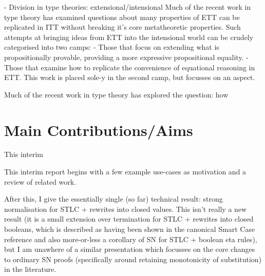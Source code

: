 \documentclass[
    a4paper, %
    fontsize=9.5pt, %
    twoside=false, %
	numbers=noenddot, %
	fontmethod=tex, %
]{kaobook}
\begin{document}


- Division in type theories: extensional/intensional
Much of the recent work in type theory has examined questions about many
properties of ETT can be replicated in ITT without breaking it's core
metatheoretic properties.
Such attempts at bringing ideas from ETT into the intensional world can be
crudely categorised into two camps:
- Those that focus on extending what is propositionally provable, providing
a more expressive propositional equality.
- Those that examine how to replicate the convenience of equational reasoning
  in ETT.
This work is placed sole-y in the second camp, but focusses on an aspect.




Much of the recent work in type theory has explored the question: how








\section{Main Contributions/Aims}

This interim

This interim report begins with a few example use-cases as motivation and a
review of related work. 

After this, I give the essentially single (so far) 
technical result: strong normalisation for STLC + rewrites into closed values.
This isn't really a new result (it is a small extension over termination for 
STLC + rewrites into closed booleans, which is described as having been shown
in the canonical Smart Case reference and also more-or-less a corollary 
of SN for STLC + boolean eta rules), but I am unawhere of a similar 
presentation which focusses on the
core changes to ordinary SN proofs (specifically around retaining monotonicity
of substitution) in the literature.
\end{document}
